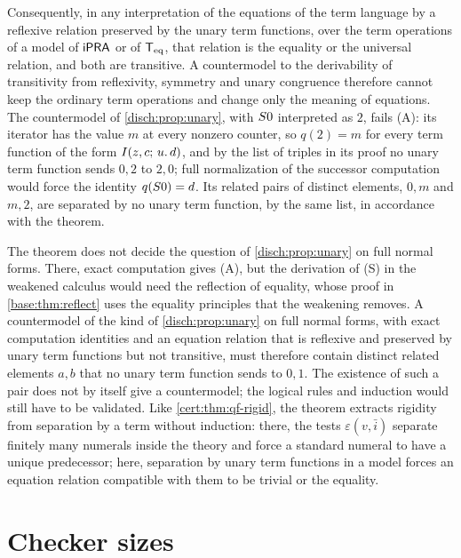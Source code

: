 Consequently, in any interpretation of the equations of the term language by a
reflexive relation preserved by the unary term functions, over the term
operations of a model of $\mathsf{iPRA}$ or of $\mathsf{T}_{\mathrm{eq}}$, that relation is the equality or
the universal relation, and both are transitive. A countermodel to the
derivability of transitivity from reflexivity, symmetry and unary congruence
therefore cannot keep the ordinary term operations and change only the meaning
of equations. The countermodel of \cref{disch:prop:unary}, with $S 0$
interpreted as $2$, fails (A): its iterator has the value $m$ at every nonzero
counter, so $q(2)=m$ for every term function of the form
$I(z,c;\,u.\,d)$, and by the list of triples in its proof no unary term
function sends $0,2$ to $2,0$; full normalization of the successor computation
would force the identity $q(S 0)=d$. Its related pairs of distinct elements,
$0,m$ and $m,2$, are separated by no unary term function, by the same list, in
accordance with the theorem.

The theorem does not decide the question of \cref{disch:prop:unary} on full
normal forms. There, exact computation gives (A), but the derivation of (S) in
the weakened calculus would need the reflection of equality, whose proof in
\cref{base:thm:reflect} uses the equality principles that the weakening removes.
A countermodel of the kind of \cref{disch:prop:unary} on full normal forms, with
exact computation identities and an equation relation that is reflexive and
preserved by unary term functions but not transitive, must therefore contain
distinct related elements $a,b$ that no unary term function sends to $0,1$. The
existence of such a pair does not by itself give a countermodel; the logical
rules and induction would still have to be validated. Like
\cref{cert:thm:qf-rigid}, the theorem extracts rigidity from separation by a
term without induction: there, the tests $\varepsilon(v,\bar i)$ separate finitely
many numerals inside the theory and force a standard numeral to have a unique
predecessor; here, separation by unary term functions in a model forces an
equation relation compatible with them to be trivial or the equality.

\section{Checker sizes}\label{cert:sec:sizes}

